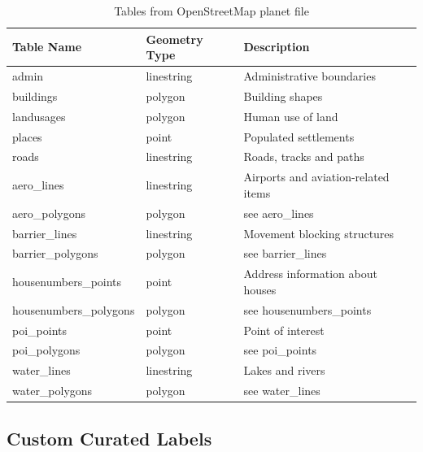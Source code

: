 \begin{table}[H]
\centering
    \begin{tabular}{lll}
    \hline
    Table Name            & Geometry Type & Description \\
    \hline                                          
    admin                  & linestring    & Administrative boundaries \\
    buildings              & polygon       & Building shapes                            \\
    landusages             & polygon       & Human use of land \\
    places                 & point         & Populated settlements                      \\
    roads                  & linestring    & Roads, tracks and paths          \\
    aero\_lines            & linestring    & Airports and aviation-related items        \\
    aero\_polygons         & polygon       & see aero\_lines                            \\
    barrier\_lines         & linestring    & Movement blocking structures   \\
    barrier\_polygons      & polygon       & see barrier\_lines                         \\
    housenumbers\_points   & point         & Address information about houses \\
    housenumbers\_polygons & polygon       & see housenumbers\_points                   \\
    poi\_points            & point         & Point of interest                          \\
    poi\_polygons          & polygon       & see poi\_points                            \\
    water\_lines           & linestring    & Lakes and rivers                           \\
    water\_polygons        & polygon       & see water\_lines                           \\
    \end{tabular}
    \caption{Tables from OpenStreetMap planet file}
\end{table}

\subsection{Custom Curated Labels}

